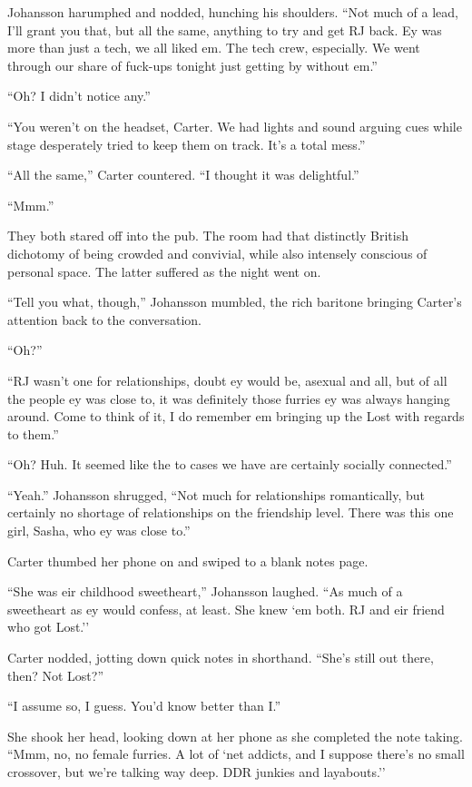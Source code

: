 Johansson harumphed and nodded, hunching his shoulders.  ``Not much of a lead, I'll grant you that, but all the same, anything to try and get RJ back.  Ey was more than just a tech, we all liked em.  The tech crew, especially.  We went through our share of fuck-ups tonight just getting by without em.''

``Oh?  I didn't notice any.''

``You weren't on the headset, Carter.  We had lights and sound arguing cues while stage desperately tried to keep them on track.  It's a total mess.''

``All the same,'' Carter countered.  ``I thought it was delightful.''

``Mmm.''

They both stared off into the pub.  The room had that distinctly British dichotomy of being crowded and convivial, while also intensely conscious of personal space.  The latter suffered as the night went on.

``Tell you what, though,'' Johansson mumbled, the rich baritone bringing Carter's attention back to the conversation.

``Oh?''

``RJ wasn't one for relationships, doubt ey would be, asexual and all, but of all the people ey was close to, it was definitely those furries ey was always hanging around.  Come to think of it, I do remember em bringing up the Lost with regards to them.''

``Oh?  Huh.  It seemed like the to cases we have are certainly socially connected.''

``Yeah.''  Johansson shrugged, ``Not much for relationships romantically, but certainly no shortage of relationships on the friendship level.  There was this one girl, Sasha, who ey was close to.''

Carter thumbed her phone on and swiped to a blank notes page.

``She was eir childhood sweetheart,'' Johansson laughed.  ``As much of a sweetheart as ey would confess, at least.  She knew `em both.  RJ and eir friend who got Lost.''

Carter nodded, jotting down quick notes in shorthand.  ``She's still out there, then?  Not Lost?''

``I assume so, I guess.  You'd know better than I.''

She shook her head, looking down at her phone as she completed the note taking.  ``Mmm, no, no female furries.  A lot of `net addicts, and I suppose there's no small crossover, but we're talking way deep.  DDR junkies and layabouts.''

